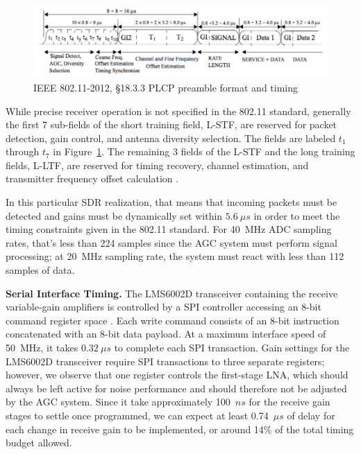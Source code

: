 \begin{figure}[h] %
\centering
\includegraphics[width=1\linewidth]{./figs/agc/agc_80211_plcp_format}
\caption{IEEE 802.11-2012, \S18.3.3 \ac{PLCP} preamble format and timing \cite{std11_2012}}
\label{fig_agc_80211_plcp}
\end{figure}


	While precise receiver operation is not specified in the 802.11 standard, generally the first 7 sub-fields of the short training field, L-STF, are reserved for packet detection, gain control, and antenna diversity selection.
	The fields are labeled $t_1$ through $t_7$ in Figure~\ref{fig_agc_80211_plcp}.
	The remaining 3 fields of the L-STF and the long training fields, L-LTF, are reserved for timing recovery, channel estimation, and transmitter frequency offset calculation \cite{perahia2013next}.

	In this particular \ac{SDR} realization, that means that incoming packets must be detected and gains must be dynamically set within $5.6~\mu s$ in order to meet the timing constraints given in the 802.11 standard.
	For 40~MHz \ac{ADC} sampling rates, that's less than 224 samples since the \ac{AGC} system must perform signal processing; at 20~MHz sampling rate, the system must react with less than 112 samples of data.

\textbf{Serial Interface Timing.} The LMS6002D transceiver containing the receive variable-gain amplifiers is controlled by a \ac{SPI} controller accessing an 8-bit command register space \cite{lime2012lms6002d}.
	Each write command consists of an 8-bit instruction concatenated with an 8-bit data payload.
At a maximum interface speed of 50~MHz, it takes $0.32~\mu s$ to complete each \ac{SPI} transaction.
	Gain settings for the LMS6002D transceiver require \ac{SPI} transactions to three separate registers; however, we observe that one register controls the first-stage \ac{LNA}, which should always be left active for noise performance and should therefore not be adjusted by the \ac{AGC} system.
	Since it take approximately 100~$ns$ for the receive gain stages to settle once programmed, we can expect at least 0.74~$\mu s$ of delay for each change in receive gain to be implemented, or around 14\% of the total timing budget allowed.

